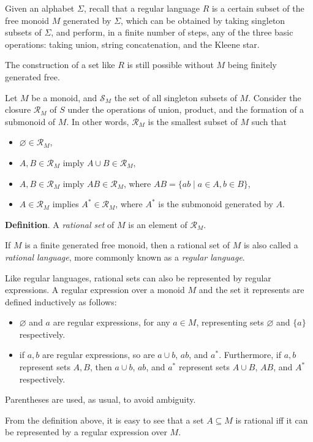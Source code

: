 \documentclass[12pt]{article}
\begin{document}
Given an alphabet $\Sigma$, recall that a regular language $R$ is a certain subset of the free monoid $M$ generated by $\Sigma$, which can be obtained by taking singleton subsets of $\Sigma$, and perform, in a finite number of steps, any of the three basic operations: taking union, string concatenation, and the Kleene star.  

The construction of a set like $R$ is still possible without $M$ being finitely generated free.

Let $M$ be a monoid, and $\mathcal{S}_M$ the set of all singleton subsets of $M$.  Consider the closure $\mathcal{R}_M$ of $S$ under the operations of union, product, and the formation of a submonoid of $M$.  In other words, $\mathcal{R}_M$ is the smallest subset of $M$ such that
\begin{itemize}
\item $\varnothing\in \mathcal{R}_M$,
\item $A,B\in \mathcal{R}_M$ imply $A\cup B \in \mathcal{R}_M$,
\item $A,B\in \mathcal{R}_M$ imply $AB\in \mathcal{R}_M$, where $AB=\lbrace ab\mid a\in A,b\in B\rbrace$,
\item $A\in \mathcal{R}_M$ implies $A^*\in \mathcal{R}_M$, where $A^*$ is the submonoid generated by $A$.
\end{itemize}
\textbf{Definition}.  A \emph{rational set} of $M$ is an element of $\mathcal{R}_M$.  

If $M$ is a finite generated free monoid, then a rational set of $M$ is also called a \emph{rational language}, more commonly known as a \emph{regular language}.

Like regular languages, rational sets can also be represented by regular expressions.  A regular expression over a monoid $M$ and the set it represents are defined inductively as follows:
\begin{itemize}
\item $\varnothing$ and $a$ are regular expressions, for any $a\in M$, representing sets $\varnothing$ and $\lbrace a\rbrace$ respectively.
\item if $a,b$ are regular expressions, so are $a\cup b$, $ab$, and $a^*$.  Furthermore, if $a,b$ represent sets $A,B$, then $a\cup b$, $ab$, and $a^*$ represent sets $A\cup B$, $AB$, and $A^*$ respectively.
\end{itemize}
Parentheses are used, as usual, to avoid ambiguity.

From the definition above, it is easy to see that a set $A\subseteq M$ is rational iff it can be represented by a regular expression over $M$.
\end{document}
